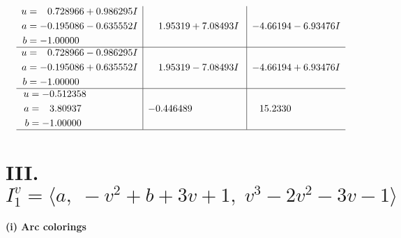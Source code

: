 \documentclass[1p]{elsarticle_modified}
\theoremstyle{definition}
\begin{document}
$$\begin{array}{c|c|c}
\begin{aligned}
u &= \phantom{-}0.728966 + 0.986295 I \\
a &= -0.195086 - 0.635552 I \\
b &= -1.00000\phantom{ +0.000000I}\end{aligned}
 & \phantom{-}1.95319 + 7.08493 I & -4.66194 - 6.93476 I \\ \hline\begin{aligned}
u &= \phantom{-}0.728966 - 0.986295 I \\
a &= -0.195086 + 0.635552 I \\
b &= -1.00000\phantom{ +0.000000I}\end{aligned}
 & \phantom{-}1.95319 - 7.08493 I & -4.66194 + 6.93476 I \\ \hline\begin{aligned}
u &= -0.512358\phantom{ +0.000000I} \\
a &= \phantom{-}3.80937\phantom{ +0.000000I} \\
b &= -1.00000\phantom{ +0.000000I}\end{aligned}
 & -0.446489\phantom{ +0.000000I} & \phantom{-}15.2330\phantom{ +0.000000I}\\
 \hline 
 \end{array}$$\newpage\newpage\renewcommand{\arraystretch}{1}
\centering \section*{III. $I^v_{1}= \langle a,\;- v^2+b+3 v+1,\;v^3-2 v^2-3 v-1 \rangle$}
\flushleft \textbf{(i) Arc colorings}\\
\end{document}
